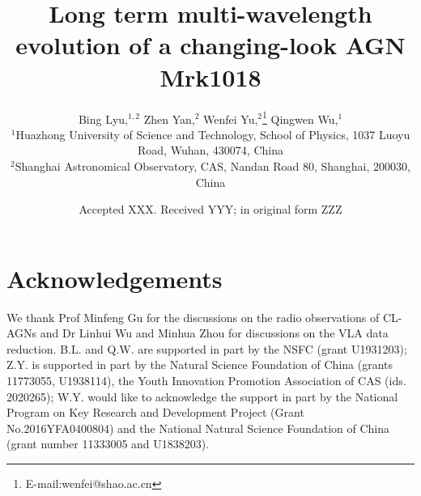 \documentclass[fleqn,usenatbib]{mnras}
\title[Mrk1018]{Long term multi-wavelength evolution of a changing-look AGN Mrk1018}
\author[Bing Lyu et al.]{
Bing Lyu,$^{1,2}$
Zhen Yan,$^{2}$
Wenfei Yu,$^{2}$\thanks{E-mail:wenfei@shao.ac.cn}
Qingwen Wu,$^{1}$%
\\
$^{1}$Huazhong University of Science and Technology, School of Physics, 1037 Luoyu Road, Wuhan, 430074, China\\
$^{2}$Shanghai Astronomical Observatory, CAS, 
Nandan Road 80, Shanghai, 200030, China\\
}
\date{Accepted XXX. Received YYY; in original form ZZZ}
\begin{document}
\label{firstpage}
\pagerange{\pageref{firstpage}--\pageref{lastpage}}
\maketitle


\def\sectionautorefname{Section}
\def\subsectionautorefname{Section}















\section*{Acknowledgements}
We thank Prof Minfeng Gu for the discussions on the radio observations of CL-AGNs and Dr Linhui Wu and Minhua Zhou for discussions on the VLA data reduction. B.L. and Q.W. are supported in part by the NSFC (grant U1931203); Z.Y. is supported in part by the Natural Science Foundation of China (grants 11773055, U1938114), the Youth Innovation Promotion Association of CAS (ids. 2020265); W.Y. would like to acknowledge the support in part by the National Program on Key Research and Development Project (Grant No.2016YFA0400804) and the National Natural Science Foundation of China (grant number 11333005 and U1838203).







\end{document}
